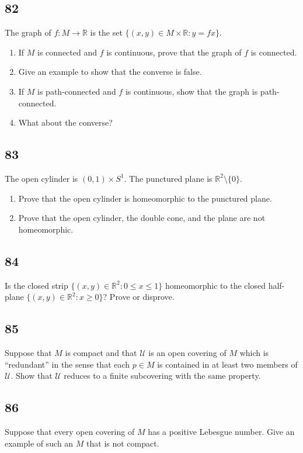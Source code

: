 \documentclass{amsart}
\begin{document}
\subsection*{82}
The graph of $f : M \to \mathbb{R}$ is the set $\{(x,y) \in M \times \mathbb{R} : y = fx\}$.
\begin{enumerate}[label=(\alph*)]
\item If $M$ is connected and $f$ is continuous, prove that the graph of $f$ is connected.
\item Give an example to show that the converse is false.
\item If $M$ is path-connected and $f$ is continuous, show that the graph is path-connected.
\item What about the converse?
\end{enumerate}

\subsection*{83}
The open cylinder is $(0,1) \times S^1$. The punctured plane is $\mathbb{R}^2 \setminus \{0\}$.
\begin{enumerate}[label=(\alph*)]
\item Prove that the open cylinder is homeomorphic to the punctured plane.
\item Prove that the open cylinder, the double cone, and the plane are not homeomorphic.
\end{enumerate}

\subsection*{84}
Is the closed strip $\{(x,y) \in \mathbb{R}^2 : 0 \le x \le 1\}$ homeomorphic to the closed half-plane $\{(x,y) \in \mathbb{R}^2 : x \ge 0\}$? Prove or disprove.

\subsection*{85}
Suppose that $M$ is compact and that $\mathcal{U}$ is an open covering of $M$ which is ``redundant'' in the sense that each $p \in M$ is contained in at least two members of $\mathcal{U}$. Show that $\mathcal{U}$ reduces to a finite subcovering with the same property.

\subsection*{86}
Suppose that every open covering of $M$ has a positive Lebesgue number. Give an example of such an $M$ that is not compact.
\end{document}
